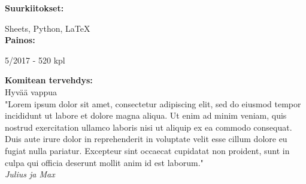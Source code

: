 \textbf{Suurkiitokset:}

Sheets, Python, \LaTeX
\\

\textbf{Painos:}

5/2017 - 520 kpl

\newpage

\textbf{Komitean tervehdys:}
\\

Hyvää vappua
\\

"Lorem ipsum dolor sit amet, consectetur adipiscing elit, sed do eiusmod tempor incididunt ut labore et dolore magna aliqua. Ut enim ad minim veniam, quis nostrud exercitation ullamco laboris nisi ut aliquip ex ea commodo consequat. Duis aute irure dolor in reprehenderit in voluptate velit esse cillum dolore eu fugiat nulla pariatur. Excepteur sint occaecat cupidatat non proident, sunt in culpa qui officia deserunt mollit anim id est laborum."
\\

\textit{Julius ja Max}


\newpage